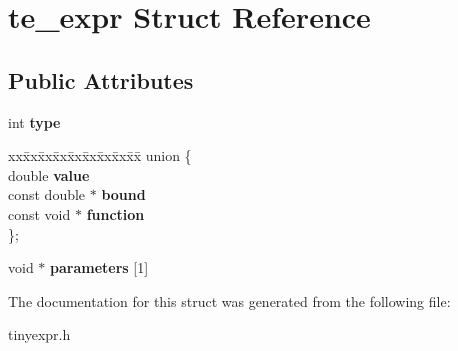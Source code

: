 \hypertarget{structte__expr}{}\section{te\+\_\+expr Struct Reference}
\label{structte__expr}
\subsection*{Public Attributes}
\begin{DoxyCompactItemize}
\item 
\mbox{\label{structte__expr_a3e7afb069294af6962be87bfaeaf5edc}} 
int {\bfseries type}
\item 
\mbox{\label{structte__expr_a32ba58ac78c22431f2ec21588a55a6c7}} 
\begin{tabbing}
xx\=xx\=xx\=xx\=xx\=xx\=xx\=xx\=xx\=\kill
union \{\\
\>double {\bfseries value}\\
\>const double $\ast$ {\bfseries bound}\\
\>const void $\ast$ {\bfseries function}\\
\}; \\

\end{tabbing}\item 
\mbox{\label{structte__expr_a7550723e1c4a64aa27fc34cac5150268}} 
void $\ast$ {\bfseries parameters} \mbox{[}1\mbox{]}
\end{DoxyCompactItemize}


The documentation for this struct was generated from the following file\+:\begin{DoxyCompactItemize}
\item 
tinyexpr.\+h\end{DoxyCompactItemize}
